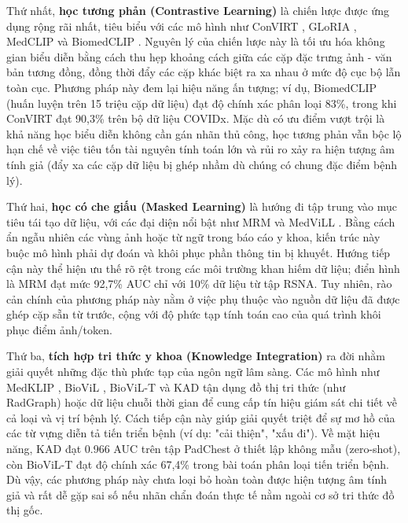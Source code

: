 \begin{refsection}
Thứ nhất, \textbf{học tương phản (Contrastive Learning)} là chiến lược được ứng dụng rộng rãi nhất, tiêu biểu với các mô hình như ConVIRT \cite{ConVIRT}, GLoRIA \cite{GLoRIA}, MedCLIP \cite{MedCLIP} và BiomedCLIP \cite{BiomedCLIP}. Nguyên lý của chiến lược này là tối ưu hóa không gian biểu diễn bằng cách thu hẹp khoảng cách giữa các cặp đặc trưng ảnh - văn bản tương đồng, đồng thời đẩy các cặp khác biệt ra xa nhau ở mức độ cục bộ lẫn toàn cục. Phương pháp này đem lại hiệu năng ấn tượng; ví dụ, BiomedCLIP \cite{BiomedCLIP} (huấn luyện trên 15 triệu cặp dữ liệu) đạt độ chính xác phân loại 83\%, trong khi ConVIRT \cite{ConVIRT} đạt 90,3\% trên bộ dữ liệu COVIDx. Mặc dù có ưu điểm vượt trội là khả năng học biểu diễn không cần gán nhãn thủ công, học tương phản vẫn bộc lộ hạn chế về việc tiêu tốn tài nguyên tính toán lớn và rủi ro xảy ra hiện tượng âm tính giả (đẩy xa các cặp dữ liệu bị ghép nhầm dù chúng có chung đặc điểm bệnh lý).

Thứ hai, \textbf{học có che giấu (Masked Learning)} là hướng đi tập trung vào mục tiêu tái tạo dữ liệu, với các đại diện nổi bật như MRM \cite{MRM} và MedViLL \cite{MedViLL}. Bằng cách ẩn ngẫu nhiên các vùng ảnh hoặc từ ngữ trong báo cáo y khoa, kiến trúc này buộc mô hình phải dự đoán và khôi phục phần thông tin bị khuyết. Hướng tiếp cận này thể hiện ưu thế rõ rệt trong các môi trường khan hiếm dữ liệu; điển hình là MRM \cite{MRM} đạt mức 92,7\% AUC chỉ với 10\% dữ liệu từ tập RSNA. Tuy nhiên, rào cản chính của phương pháp này nằm ở việc phụ thuộc vào nguồn dữ liệu đã được ghép cặp sẵn từ trước, cộng với độ phức tạp tính toán cao của quá trình khôi phục điểm ảnh/token.

Thứ ba, \textbf{tích hợp tri thức y khoa (Knowledge Integration)} ra đời nhằm giải quyết những đặc thù phức tạp của ngôn ngữ lâm sàng. Các mô hình như MedKLIP \cite{MedKLIP}, BioViL \cite{BioViL}, BioViL-T \cite{BioViL-T} và KAD \cite{KAD} tận dụng đồ thị tri thức (như RadGraph) hoặc dữ liệu chuỗi thời gian để cung cấp tín hiệu giám sát chi tiết về cả loại và vị trí bệnh lý. Cách tiếp cận này giúp giải quyết triệt để sự mơ hồ của các từ vựng diễn tả tiến triển bệnh (ví dụ: "cải thiện", "xấu đi"). Về mặt hiệu năng, KAD \cite{KAD} đạt 0.966 AUC trên tập PadChest ở thiết lập không mẫu (zero-shot), còn BioViL-T \cite{BioViL-T} đạt độ chính xác 67,4\% trong bài toán phân loại tiến triển bệnh. Dù vậy, các phương pháp này chưa loại bỏ hoàn toàn được hiện tượng âm tính giả và rất dễ gặp sai số nếu nhãn chẩn đoán thực tế nằm ngoài cơ sở tri thức đồ thị gốc.


\end{refsection}
